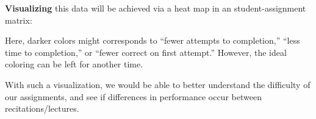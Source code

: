 \documentclass{techbrief}
\begin{document}
\begin{xframe}
    \textbf{Visualizing} this data will be achieved via a heat map in an
    student-assignment matrix:
    \begin{center}
    \end{center}
    Here, darker colors might corresponds to ``fewer attempts to completion,'' ``less time to completion,'' or ``fewer correct on first attempt.'' However, the ideal coloring can be left for another time.

    With such a visualization, we would be able to better understand the
    difficulty of our assignments, and see if differences in performance occur
    between recitations/lectures.
\end{xframe}
\end{document}

